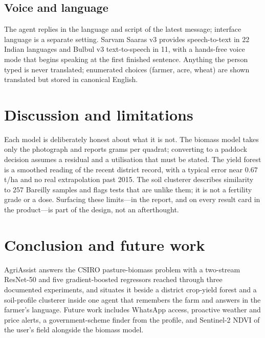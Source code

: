 \documentclass[11pt,a4paper]{article}
\begin{document}
\subsection{Voice and language}
The agent replies in the language and script of the latest message; interface language is a separate
setting. Sarvam Saaras v3 provides speech-to-text in 22 Indian languages and Bulbul v3
text-to-speech in 11, with a hands-free voice mode that begins speaking at the first finished
sentence. Anything the person typed is never translated; enumerated choices (farmer, acre, wheat)
are shown translated but stored in canonical English.

\section{Discussion and limitations}
Each model is deliberately honest about what it is not. The biomass model takes only the photograph
and reports grams per quadrat; converting to a paddock decision assumes a residual and a utilisation
that must be stated. The yield forest is a smoothed reading of the recent district record, with a
typical error near $0.67$ t/ha and no real extrapolation past 2015. The soil clusterer describes
similarity to $257$ Bareilly samples and flags tests that are unlike them; it is not a fertility
grade or a dose. Surfacing these limits---in the report, and on every result card in the
product---is part of the design, not an afterthought.

\section{Conclusion and future work}
AgriAssist answers the CSIRO pasture-biomass problem with a two-stream ResNet-50 and five
gradient-boosted regressors reached through three documented experiments, and situates it beside a
district crop-yield forest and a soil-profile clusterer inside one agent that remembers the farm and
answers in the farmer's language. Future work includes WhatsApp access, proactive weather and price
alerts, a government-scheme finder from the profile, and Sentinel-2 NDVI of the user's field
alongside the biomass model.
\end{document}
